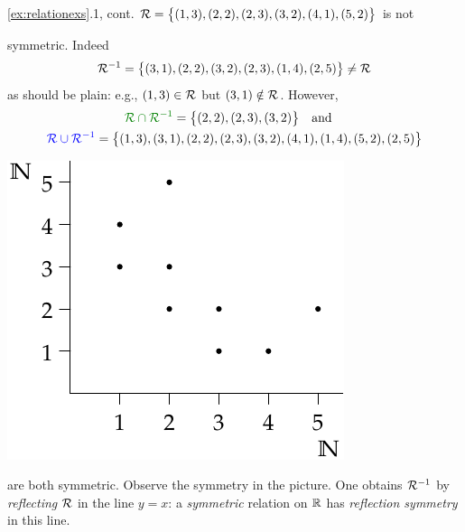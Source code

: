 \begin{example*}{\ref{ex:relationexs}.1, cont.}{}
	$\mathcal{R}=\bigl\{(1,3),(2,2),(2,3),(3,2),(4,1),(5,2)\bigr\}$ is not\par
	\begin{minipage}[t]{0.75\linewidth}\vspace{-8pt}
		symmetric. Indeed
		\[
			\mathcal{R}^{-1}=\bigl\{(3,1),(2,2),(3,2),(2,3),(1,4),(2,5)\bigr\} \neq \mathcal{R}
		\]
		as should be plain: e.g., $(1,3)\in\mathcal{R}$ but $(3,1)\notin\mathcal{R}$. However,
		\begin{gather*}
			\textcolor{Green}{\cR\cap \cR^{-1}}=\bigl\{(2,2), (2,3), (3,2)\bigr\}
			\quad\text{and}\quad\\
			\textcolor{blue}{\cR\cup \cR^{-1}}
			=\bigl\{(1,3),(3,1),(2,2),(2,3),(3,2),(4,1),(1,4),(5,2),(2,5)\bigr\}
		\end{gather*}
	\end{minipage}
	\hfill
	\begin{minipage}[t]{0.24\linewidth}\vspace{-20pt}
		\hfill
		\includegraphics{relations-04-relnun}
	\end{minipage}
	\medbreak
	are both symmetric.	Observe the symmetry in the picture. One obtains $\mathcal{R}^{-1}$ by \emph{reflecting\footnotemark} $\mathcal{R}$ in the line $y=x$: a \emph{symmetric} relation on $\mathbb{R}$ has \emph{reflection symmetry} in this line.
\end{example*}

\vspace{-10pt}


\goodbreak


